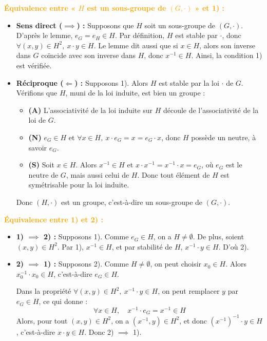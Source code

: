 \documentclass[a4paper,11pt]{article}
\newcommand{\cas}[1]{\textbf{\textcolor{orange}{#1}}}
\begin{document}
\begin{demonstration}
\cas{Équivalence entre « $H$ est un sous-groupe de $(G, \cdot)$ » et 1) :}
\begin{itemize}
    \item \textbf{Sens direct ($\implies$) :} Supposons que $H$ soit un sous-groupe de $(G, \cdot)$.
    D'après le lemme, $e_G = e_H \in H$.
    Par définition, $H$ est stable par $\cdot$, donc $\forall (x, y) \in H^2, \ x \cdot y \in H$.
    Le lemme dit aussi que si $x \in H$, alors son inverse dans $G$ coïncide avec son inverse dans $H$, donc $x^{-1} \in H$.
    Ainsi, la condition 1) est vérifiée.
    
    \item \textbf{Réciproque ($\Longleftarrow$) :} Supposons 1).
    Alors $H$ est stable par la loi $\cdot$ de $G$. Vérifions que $H$, muni de la loi induite, est bien un groupe :
    \begin{itemize}
        \item \textbf{(A)} L'associativité de la loi induite sur $H$ découle de l'associativité de la loi de $G$.
        \item \textbf{(N)} $e_G \in H$ et $\forall x \in H, \ x \cdot e_G = x = e_G \cdot x$, donc $H$ possède un neutre, à savoir $e_G$.
        \item \textbf{(S)} Soit $x \in H$. Alors $x^{-1} \in H$ et $x \cdot x^{-1} = x^{-1} \cdot x = e_G$, où $e_G$ est le neutre de $G$, mais aussi celui de $H$. Donc tout élément de $H$ est symétrisable pour la loi induite.
    \end{itemize}
    Donc $(H, \cdot)$ est un groupe, c'est-à-dire un sous-groupe de $(G, \cdot)$.
\end{itemize}

\vspace{8pt}
\cas{Équivalence entre 1) et 2) :}
\begin{itemize}
    \item \textbf{1) $\implies$ 2) :} Supposons 1). Comme $e_G \in H$, on a $H \neq \emptyset$.
    De plus, soient $(x, y) \in H^2$. Par 1), $x^{-1} \in H$, et par stabilité de $H$, $x^{-1} \cdot y \in H$. D'où 2).
    
    \item \textbf{2) $\implies$ 1) :} Supposons 2).
    Comme $H \neq \emptyset$, on peut choisir $x_0 \in H$. Alors $x_0^{-1} \cdot x_0 \in H$, c'est-à-dire $e_G \in H$.
    
    Dans la propriété $\forall (x, y) \in H^2, \ x^{-1} \cdot y \in H$, on peut remplacer $y$ par $e_G \in H$, ce qui donne :
    \[
    \forall x \in H, \quad x^{-1} \cdot e_G = x^{-1} \in H
    \]
    Alors, pour tout $(x, y) \in H^2$, on a $(x^{-1}, y) \in H^2$, et donc $(x^{-1})^{-1} \cdot y \in H$, c'est-à-dire $x \cdot y \in H$.
    Donc 2) $\implies$ 1).
\end{itemize}
\end{demonstration}
\end{document}

